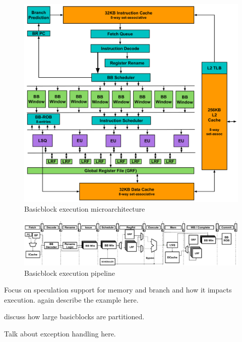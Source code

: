 \begin{figure}
	\centering
	\includegraphics[width=1.0\columnwidth]{fig/bb_architecture.pdf} 
	\caption{Basicblock execution microarchitecture}
	\label{fig:bb_arch}
\end{figure}


\begin{figure}
	\centering
	\includegraphics[width=\textwidth]{fig/pipeline.pdf} 
	\caption{Basicblock execution pipeline}
	\label{fig:pipeline}
\end{figure}




%

Focus on speculation support for memory and branch and how it impacts execution.
again describe the example here.


discuss how large basicblocks are partitioned.


Talk about exception handling here.
